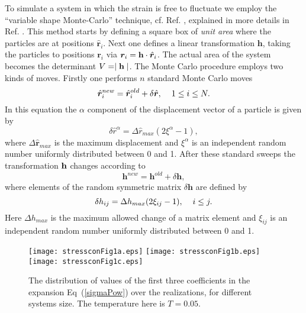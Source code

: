 \documentclass[pre,twocolumn,aps,10pt,superscriptaddress,notitlepage,nofootinbib]{revtex4-1}
\newcommand{\B}[1]{{\bm{#1}}}
\begin{document}
To simulate a system in which the strain is free to fluctuate we employ the ``variable shape Monte-Carlo''  technique, cf. Ref. \cite{PR81,PR80}, explained in more details in Ref. \cite{DIMP14}.
This method starts by defining a square box of {\em unit area} where the particles are at positions $\hat{ \B r}_i$. Next one defines a linear transformation $\B h$, taking the particles to positions $\B r_i$ via $\B r_i={\bf h}\cdot \hat{ \B r}_i$.  The actual area of the system becomes the determinant
$V=\mid {\bf h}\mid$. The Monte Carlo procedure employs two kinds of moves. Firstly one performs $n$ standard Monte Carlo moves
\begin{equation}
\hat{ \B r}^{new}_i=\hat{ \B r}^{old}_i+\delta \hat{ \B r},\hspace{4 mm} 1\le i\le N.
\label{Rmove}
\end{equation}
In this equation the $\alpha$ component of the displacement vector of a particle is given by
\begin{equation}
\delta \hat{  r}^{\alpha}=\Delta \hat{ r}_{max}(2\xi^\alpha-1),
\label{ParDisp}
\end{equation}
where $\Delta \hat{ \B r}_{max}$ is the maximum displacement and
$\xi^\alpha$ is an independent random number uniformly distributed between 0 and 1.
After these standard sweeps the transformation ${\bf h}$ changes according to
\begin{equation}
\B h^{new}=\B h^{old}+\delta\B h,
\label{hnew}
\end{equation}
where elements of the random symmetric matrix $\delta\B h$ are defined by
\begin{equation}
\delta h_{ij}=\Delta h_{max}(2\xi_{ij}-1),\hspace{4mm} i\le j.
\label{transH}
\end{equation}
Here $\Delta h_{max}$ is the maximum allowed change of a matrix element and
$\xi_{ij}$ is an independent random number uniformly distributed between 0 and 1.
\begin{figure}
\texttt{[image: stressconFig1a.eps]}
\texttt{[image: stressconFig1b.eps]}
\texttt{[image: stressconFig1c.eps]}
 \caption{The distribution of values of the first three coefficients in the expansion Eq~(\ref{sigmaPow}) over
 the realizations, for different systems size. The temperature here is $T=0.05$.}
 \label{disFig}
 \end{figure}
\end{document}
